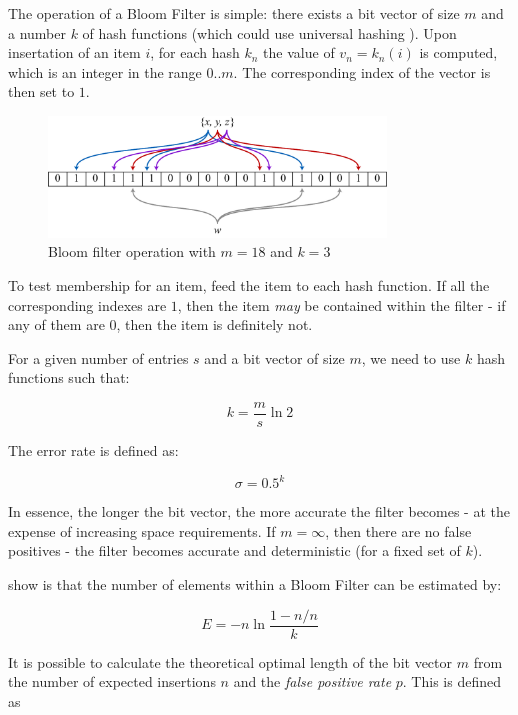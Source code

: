 	The operation of a Bloom Filter is simple: there exists a bit vector of size $m$ and a number $k$ of hash functions (which could use universal hashing \citep{Carter1979}). Upon insertation of an item $i$, for each hash $k_n$ the value of $v_n=k_n(i)$ is computed, which is an integer in the range $0..m$. The corresponding index of the vector is then set to $1$.
		
	\begin{figure}[h!]
			\centering
			\includegraphics[width=0.8\textwidth]{graphics/bloomfilter.pdf}
			\caption{Bloom filter operation with $m=18$ and $k=3$ \citep{BloomFilterWikiDiagram}}
			\label{fig:bloom-filter}
	\end{figure}
		
	To test membership for an item, feed the item to each hash function. If all the corresponding indexes are $1$, then the item \emph{may} be contained within the filter - if any of them are $0$, then the item is definitely not.
	
	For a given number of entries $s$ and a bit vector of size $m$, we need to use $k$ hash functions such that:
	
	\begin{equation}
		k = \frac{m}{s} \ln 2
		\label{eqn:optimal-hashes}
	\end{equation}
	
	The error rate is defined as:
	
	\[
	\sigma = 0.5^k
	\]
	
	In essence, the longer the bit vector, the more accurate the filter becomes - at the expense of increasing space requirements. If $m=\infty$, then there are no false positives - the filter becomes accurate and deterministic (for a fixed set of $k$).
	
	\citet{Swamidass2007} show is that the number of elements within a Bloom Filter can be estimated by:
	
	\[
	E = -n \ln \frac{1-n/n}{k}
	\]
	
	
	It is possible to calculate the theoretical optimal length of the bit vector $m$ from the number of expected insertions $n$ and the \textit{false positive rate} $p$. This is defined as

